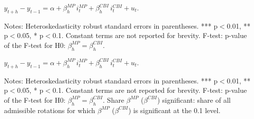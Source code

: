 \documentclass[a4paper,12pt]{article}
\newcommand{\pathTables}{../workm_lp/}
\begin{document}
\begin{table}[!htbp]
\begin{center}
\caption{The effect of ECB monetary policy and information shocks on financial variables}\label{tab: lp ecb shocks 1y}
$y^{}_{t+h}-y^{}_{t-1} = \alpha + \beta^{MP}_h\, i^{MP}_t + \beta^{CBI}_h\, i^{CBI}_t + u_t.$
\small
{}
\end{center}\footnotesize
Notes: Heteroskedasticity robust standard errors in parentheses. *** p$<$0.01, ** p$<$0.05, * p$<$0.1.
Constant terms are not reported for brevity.
F-test: p-value of the F-test for H0: $\beta^{MP}_h=\beta^{CBI}_h$.
\end{table}

\begin{table}[!htbp]
\begin{center}
\caption{The effect of ECB monetary policy and information shocks on financial variables}\label{tab: lp ecb shocks 1y pctiles}
$y^{}_{t+h}-y^{}_{t-1} = \alpha + \beta^{MP}_h\, i^{MP}_t + \beta^{CBI}_h\, i^{CBI}_t + u_t.$
\small
{}
\end{center}\footnotesize
Notes: Heteroskedasticity robust standard errors in parentheses. *** p$<$0.01, ** p$<$0.05, * p$<$0.1.
Constant terms are not reported for brevity.
F-test: p-value of the F-test for H0: $\beta^{MP}_h=\beta^{CBI}_h$.
Share $\beta^{MP}$ ($\beta^{CBI}$) significant: share of all admissible rotations for which $\beta^{MP}$ ($\beta^{CBI}$) is significant at the 0.1 level.
\end{table}
\end{document}
